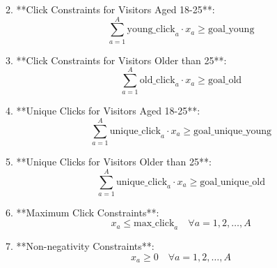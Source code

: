 \documentclass{article}
\begin{document}
2. **Click Constraints for Visitors Aged 18-25**:
\[
\sum_{a=1}^{A} \text{young\_click}_a \cdot x_a \geq \text{goal\_young}
\]

3. **Click Constraints for Visitors Older than 25**:
\[
\sum_{a=1}^{A} \text{old\_click}_a \cdot x_a \geq \text{goal\_old}
\]

4. **Unique Clicks for Visitors Aged 18-25**:
\[
\sum_{a=1}^{A} \text{unique\_click}_a \cdot x_a \geq \text{goal\_unique\_young}
\]

5. **Unique Clicks for Visitors Older than 25**:
\[
\sum_{a=1}^{A} \text{unique\_click}_a \cdot x_a \geq \text{goal\_unique\_old}
\]

6. **Maximum Click Constraints**:
\[
x_a \leq \text{max\_click}_a \quad \forall a = 1, 2, \ldots, A
\]

7. **Non-negativity Constraints**:
\[
x_a \geq 0 \quad \forall a = 1, 2, \ldots, A
\]
\end{document}
